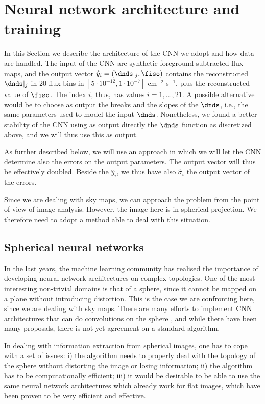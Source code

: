 \section{Neural network architecture and training}
\label{sec:architechture-and-training}

In this Section we describe the architecture of the CNN we adopt and how data are handled.
%
The input of the CNN are synthetic foreground-subtracted flux maps, and the output vector ${\hat y}_i = (\dnds|_j, \fiso)$ contains the reconstructed $\dnds|_j$ in 20 flux bins in {$[5 \cdot 10^{-12}, 1 \cdot 10^{-7}]$} cm$^{-2}$ s$^{-1}$, plus the reconstructed value of $\fiso$. The index $i$, thus, has values $i=1,...,21$.
A possible alternative would be to choose as output
the breaks and the slopes of the $\dnds$, i.e., the same parameters used to model the input $\dnds$. Nonetheless, we found a better stability of the CNN using as output directly the $\dnds$ function as discretized above, and we will thus use this as output. 

As further described below, we will use an approach in which we will let the CNN determine also the errors on the output parameters. The output vector will thus be effectively doubled. Beside the ${\hat y}_i$, we thus have also $\hat{\sigma}_i$ the output vector of the errors. 


Since we are dealing with sky maps, we can approach the problem from the point of view of image analysis. However, the image here is in spherical projection. We therefore need to adopt a method able to deal with this situation.


\subsection{Spherical neural networks}
In the last years, the machine learning community has realised the importance of developing neural network architectures on complex topologies. One of the most interesting non-trivial domains is that of a sphere, since it cannot be mapped on a plane without introducing distortion. This is the case we are confronting here, since we are dealing with sky maps.  There are many efforts to implement CNN architectures that can do convolutions on the sphere \cite{DBLP:journals/corr/abs-1708-00919,DBLP:journals/corr/abs-1902-04615,DBLP:journals/corr/abs-2012-15000,nnhealpix,mapped-convolutions}, and while there have been many proposals, there is not yet agreement on a standard algorithm.

In dealing with information extraction from spherical images, one has to cope with a set of issues: 
i) the algorithm needs to properly deal with the topology of the sphere without distorting the image or losing information;
ii) the algorithm has to be computationally efficient;
iii) it would be desirable to be able to use the same neural network architectures which already work for flat images, which have been proven to be very efficient and effective.

